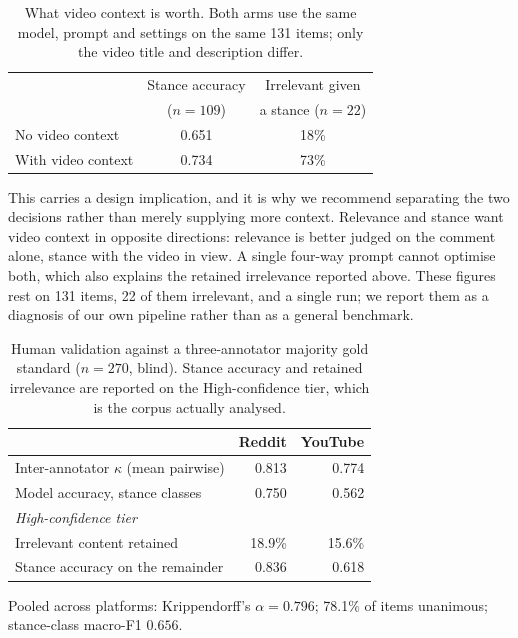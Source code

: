 \documentclass[10pt,twocolumn]{article}
\begin{document}
\begin{table}[t]
  \centering
  \small
  \caption{What video context is worth. Both arms use the same model, prompt and
  settings on the same 131 items; only the video title and description differ.}
  \label{tab:context}
  \setlength{\tabcolsep}{4pt}
  \begin{tabular}{@{}lcc@{}}
    \toprule
    & Stance accuracy & Irrelevant given \\
    & ($n=109$) & a stance ($n=22$) \\
    \midrule
    No video context   & 0.651 & 18\% \\
    With video context & 0.734 & 73\% \\
    \bottomrule
  \end{tabular}
\end{table}

This carries a design implication, and it is why we recommend separating the two
decisions rather than merely supplying more context. Relevance and stance want
video context in opposite directions: relevance is better judged on the comment
alone, stance with the video in view. A single four-way prompt cannot optimise
both, which also explains the retained irrelevance reported above. These figures
rest on 131 items, 22 of them irrelevant, and a single run; we report them as a
diagnosis of our own pipeline rather than as a general benchmark.

\begin{table}[t]
  \centering
  \small
  \caption{Human validation against a three-annotator majority gold standard
  ($n=270$, blind). Stance accuracy and retained irrelevance are reported on the
  High-confidence tier, which is the corpus actually analysed.}
  \label{tab:human}
  \begin{tabular}{lrr}
    \toprule
     & Reddit & YouTube \\
    \midrule
    Inter-annotator $\kappa$ (mean pairwise) & 0.813  & 0.774  \\
    Model accuracy, stance classes           & 0.750  & 0.562  \\
    \midrule
    \multicolumn{3}{l}{\emph{High-confidence tier}} \\
    Irrelevant content retained              & 18.9\% & 15.6\% \\
    Stance accuracy on the remainder         & 0.836  & 0.618  \\
    \bottomrule
  \end{tabular}
  \vspace{2pt}
  \footnotesize Pooled across platforms: Krippendorff's $\alpha = 0.796$;
  78.1\% of items unanimous; stance-class macro-F1 $0.656$.
\end{table}
\end{document}
